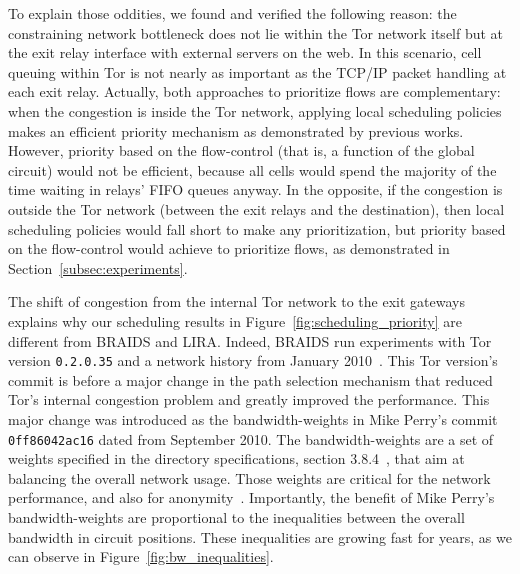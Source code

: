 To explain those oddities, we found and verified the following reason: the 
constraining network bottleneck does not lie within the
Tor network itself but at the exit relay interface with external servers on the
web. In this scenario, cell queuing within Tor is not nearly as important as the
TCP/IP packet handling at each exit relay. Actually, both approaches to prioritize 
flows are complementary: when the congestion is inside the Tor network, applying 
local scheduling policies makes an efficient priority mechanism as demonstrated by previous works. However, priority 
based on the flow-control (that is, a function of the global circuit) would not be 
efficient, because all cells would spend the majority of the time waiting in 
relays' FIFO queues anyway. In the opposite, if the congestion is outside the Tor 
network (between the exit relays and the destination), then local scheduling 
policies would fall short to make any prioritization, but priority based on the 
flow-control would achieve to prioritize flows, as demonstrated in Section~\ref{subsec:experiments}. 

The shift of congestion from the internal Tor network to the exit gateways explains why our scheduling results in Figure~\ref{fig:scheduling_priority} are different from BRAIDS
and LIRA. Indeed, BRAIDS run experiments with Tor version \texttt{0.2.0.35} and a network history
from January 2010~\cite{braids-repository}. This Tor version's commit is
before a major change in the path selection mechanism that reduced Tor's
internal congestion problem and greatly improved the performance. This major change
was introduced as the bandwidth-weights in Mike Perry's commit \texttt{0ff86042ac16}
dated from September 2010. The bandwidth-weights are a set of weights specified
in the directory specifications, section 3.8.4~\cite{dirspec}, that aim at
balancing the overall network usage. Those weights are
critical for the network performance, and also for
anonymity~\cite{waterfilling-pets2017, wf_proposal}. Importantly, the benefit
of Mike Perry's bandwidth-weights are proportional to the inequalities between
the overall bandwidth in circuit positions. These inequalities are growing fast for years, as we can observe in Figure~\ref{fig:bw_inequalities}.

